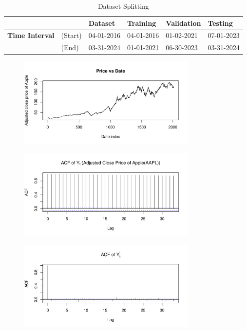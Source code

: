 \documentclass[conference,onecolumn,11pt]{IEEEtran}
\begin{document}
\begin{table}[htbp]
    \centering
    \caption{Dataset Splitting}
    \begin{tabular}{@{}rlllll@{}}
        \toprule
         && \textbf{Dataset} & \textbf{Training} & \textbf{Validation} & \textbf{Testing} \\
        \midrule
        \textbf{Time Interval} &(Start) & 04-01-2016 & 04-01-2016 & 01-02-2021 & 07-01-2023\\
        &(End)& 03-31-2024 & 01-01-2021 & 06-30-2023 & 03-31-2024\\
  
        \bottomrule
    \end{tabular}
    \label{tab:GFS}
\end{table}

\begin{figure}[htpb]
	\centering
	\includegraphics[width=0.8\textwidth]{pic/Price_vs_Date.pdf}
	\caption{}
	\label{fig:price}
\end{figure}

\begin{figure}[htpb]
	\centering
	\includegraphics[width=0.8\textwidth]{pic/ACF_AdjClosed.pdf}
	\caption{}
	\label{fig:acf1}
\end{figure}

\begin{figure}[htpb]
	\centering
	\includegraphics[width=0.8\textwidth]{pic/ACF_dAdjClosed.pdf}
	\caption{}
	\label{fig:acf2}
\end{figure}
\end{document}

